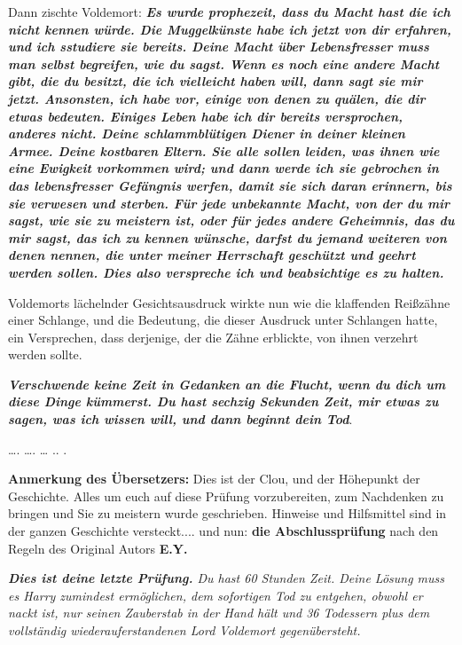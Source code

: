 Dann zischte Voldemort: \glqq{}\textbf{\emph{Es wurde prophezeit, dass du Macht
hast die ich nicht kennen würde. Die Muggelkünste habe ich jetzt von dir
erfahren, und ich sstudiere sie bereits. Deine Macht über Lebensfresser muss man
selbst begreifen, wie du sagst. Wenn es noch eine andere Macht gibt, die du
besitzt, die ich vielleicht haben will, dann sagt sie mir jetzt. Ansonsten, ich
habe vor, einige von denen zu quälen, die dir etwas bedeuten. Einiges Leben habe
ich dir bereits versprochen, anderes nicht. Deine schlammblütigen Diener in
deiner kleinen Armee. Deine kostbaren Eltern. Sie alle sollen leiden, was ihnen
wie eine Ewigkeit vorkommen wird; und dann werde ich sie gebrochen in das
lebensfresser Gefängnis werfen, damit sie sich daran erinnern, bis sie verwesen
und sterben. Für jede unbekannte Macht, von der du mir sagst, wie sie zu
meistern ist, oder für jedes andere Geheimnis, das du mir sagst, das ich zu
kennen wünsche, darfst du jemand weiteren von denen nennen, die unter meiner
Herrschaft geschützt und geehrt werden sollen. Dies also verspreche ich und
beabsichtige es zu halten.}}\grqq{}

Voldemorts lächelnder Gesichtsausdruck wirkte nun wie die klaffenden Reißzähne
einer Schlange, und die Bedeutung, die dieser Ausdruck unter Schlangen hatte,
ein Versprechen, dass derjenige, der die Zähne erblickte, von ihnen verzehrt
werden sollte.

\glqq{}\textbf{\emph{Verschwende keine Zeit in Gedanken an die Flucht, wenn du
dich um diese Dinge kümmerst. Du hast sechzig Sekunden Zeit, mir etwas zu sagen,
was ich wissen will, und dann beginnt dein Tod}}.\grqq{}

…. …. … .. .

\textbf{Anmerkung des Übersetzers:}
Dies ist der Clou, und der Höhepunkt der Geschichte. Alles um euch auf diese
Prüfung vorzubereiten, zum Nachdenken zu bringen und Sie zu meistern wurde
geschrieben. Hinweise und Hilfsmittel sind in der ganzen Geschichte
versteckt.... und nun: \textbf{die Abschlussprüfung} nach den Regeln des
Original Autors\textbf{ E.Y.}



\emph{
\textbf{Dies ist deine letzte Prüfung.}
Du hast 60 Stunden Zeit. Deine Lösung muss es Harry zumindest ermöglichen, dem
sofortigen Tod zu entgehen, obwohl er nackt ist, nur seinen Zauberstab in der
Hand hält und 36 Todessern plus dem vollständig wiederauferstandenen Lord
Voldemort gegenübersteht.}

